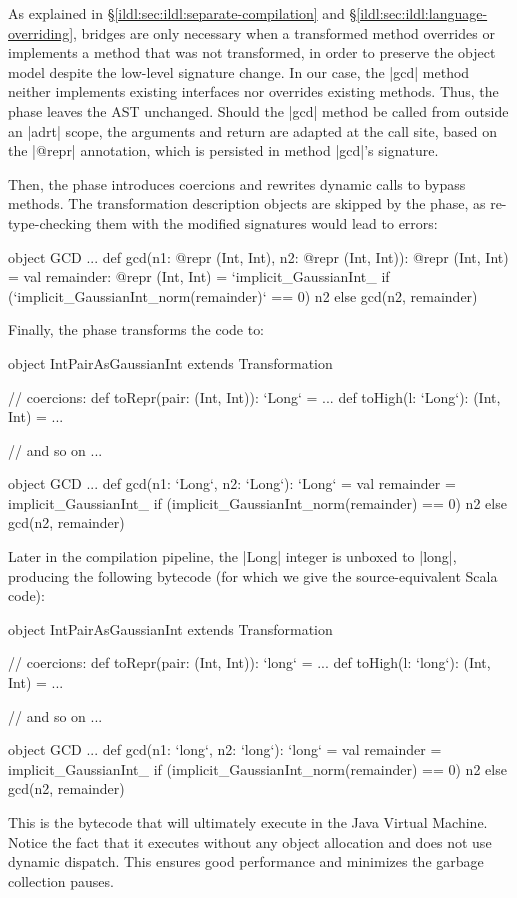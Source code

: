 As explained in \S\ref{ildl:sec:ildl:separate-compilation} and \S\ref{ildl:sec:ildl:language-overriding}, bridges are only necessary when a transformed method overrides or implements a method that was not transformed, in order to preserve the object model despite the low-level signature change. In our case, the |gcd| method neither implements existing interfaces nor overrides existing methods. Thus, the \bridge{} phase leaves the AST unchanged. Should the |gcd| method be called from outside an |adrt| scope, the arguments and return are adapted at the call site, based on the |@repr| annotation, which is persisted in method |gcd|'s signature.

Then, the \coerce{} phase introduces coercions and rewrites dynamic calls to bypass methods. The transformation description objects are skipped by the \coerce{} phase, as re-type-checking them with the modified signatures would lead to errors:


\begin{lstlisting-nobreak}
object GCD {
  ...
  def gcd(n1: @repr (Int, Int), n2: @repr (Int, Int)): @repr (Int, Int) = {
    val remainder: @repr (Int, Int) = `implicit_GaussianInt_%
    if (`implicit_GaussianInt_norm(remainder)` == 0) n2 else gcd(n2, remainder)
  }
}
\end{lstlisting-nobreak}

Finally, the \commit{} phase transforms the code to:


\begin{lstlisting-nobreak}
object IntPairAsGaussianInt extends Transformation{
  // coercions:
  def toRepr(pair: (Int, Int)): `Long` = ...
  def toHigh(l: `Long`): (Int, Int) = ...

  // and so on ...
}

object GCD {
  ...
  def gcd(n1: `Long`, n2: `Long`): `Long` = {
    val remainder = implicit_GaussianInt_%
    if (implicit_GaussianInt_norm(remainder) == 0) n2 else gcd(n2, remainder)
  }
}
\end{lstlisting-nobreak}

Later in the compilation pipeline, the |Long| integer is unboxed to |long|, producing the following bytecode (for which we give the source-equivalent Scala code):


\begin{lstlisting-nobreak}
object IntPairAsGaussianInt extends Transformation{
  // coercions:
  def toRepr(pair: (Int, Int)): `long` = ...
  def toHigh(l: `long`): (Int, Int) = ...

  // and so on ...
}

object GCD {
  ...
  def gcd(n1: `long`, n2: `long`): `long` = {
    val remainder = implicit_GaussianInt_%
    if (implicit_GaussianInt_norm(remainder) == 0) n2 else gcd(n2, remainder)
  }
}
\end{lstlisting-nobreak}

This is the bytecode that will ultimately execute in the Java Virtual Machine. Notice the fact that it executes without any object allocation and does not use dynamic dispatch. This ensures good performance and minimizes the garbage collection pauses.
